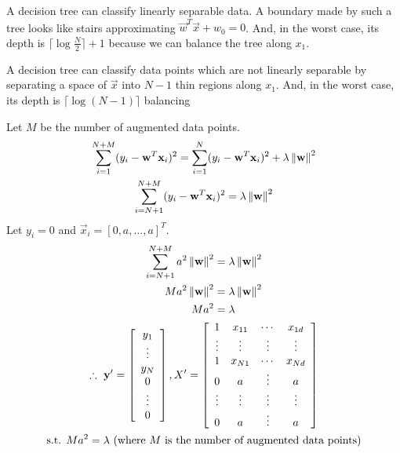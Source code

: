 \documentclass{introtosml}
\newcommand{\x}{\vec{x}}
\newcommand{\w}{\vec{w}}
\begin{document}
\maketitle

\begin{p}
  \item
    A decision tree can classify linearly separable data.
    A boundary made by such a tree looks like stairs
    approximating $\w^T \x + w_0 = 0$.
    And, in the worst case, its depth is $\lceil \log \frac{N}{2} \rceil + 1$
    because we can balance the tree along $x_1$.

  \item
    A decision tree can classify data points which are not linearly separable
    by separating a space of $\x$ into $N - 1$ thin regions along $x_1$.
    And, in the worst case, its depth is $\lceil \log (N - 1) \rceil$
    balancing

  \item
    Let $M$ be the number of augmented data points.
    \begin{gather*}
      \sum_{i=1}^{N+M} (y_i - \w^T \x_i)^2
          = \sum_{i=1}^{N} (y_i - \w^T \x_i)^2 + \lambda \norm{\w}^2 \\
      \sum_{i=N+1}^{N+M} (y_i - \w^T \x_i)^2 = \lambda \norm{\w}^2
    \end{gather*}
    Let $y_i = 0$ and $\x_i = [0, a, \ldots, a]^T $.
    \begin{gather*}
      \begin{aligned}
        \sum_{i=N+1}^{N+M} a^2 \norm{\w}^2 & = \lambda \norm{\w}^2 \\
        M a^2 \norm{\w}^2 & = \lambda \norm{\w}^2 \\
        M a^2 & = \lambda
      \end{aligned} \\
      \therefore \vec{y}' = \left[\begin{array}{cccc}
        y_1 \\ \vdots \\ y_N \\ 0 \\ \vdots \\ 0
      \end{array}\right],
      X' = \left[\begin{array}{cccc}
        1 & x_{11} & \cdots & x_{1d} \\
        \vdots & \vdots & \vdots & \vdots  \\
        1 & x_{N1} & \cdots & x_{Nd} \\
        0 & a & \vdots & a \\
        \vdots & \vdots & \vdots & \vdots  \\
        0 & a & \vdots & a \\
      \end{array}\right] \\
      \st Ma^2 = \lambda \text{(where $M$ is the number of augmented data points)}
    \end{gather*}


\end{p}
\end{document}
